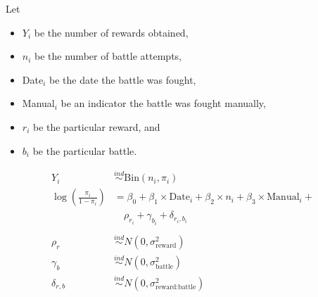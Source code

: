 \documentclass[10pt,aspectratio=169]{beamer}
\newcommand{\ind}{\stackrel{ind}{\sim}}
\begin{document}
\begin{frame}
Let 
\begin{itemize}
\item $Y_i$ be the number of rewards obtained,
\item $n_i$ be the number of battle attempts,
\item Date$_i$ be the date the battle was fought,
\item Manual$_i$ be an indicator the battle was fought manually, 
\item $r_i$ be the particular reward, and
\item $b_i$ be the particular battle. 
\end{itemize}

\vspace{0.1in}

\[ \begin{array}{rl}
Y_i & \ind \mbox{Bin}(n_i,\pi_i) \\
\log\left(\frac{\pi_i}{1-\pi_i}\right) &= \beta_0 + \beta_1\times \mbox{Date}_i + \beta_2 \times n_i + \beta_3 \times \mbox{Manual}_i + \\
& \quad \rho_{r_i} + \gamma_{b_i} + \delta_{r_i,b_i} \\
\\
\rho_r &\ind N\left(0,\sigma_{\mbox{reward}}^2\right) \\
\gamma_b &\ind N\left(0,\sigma_{\mbox{battle}}^2\right) \\
\delta_{r,b} &\ind N\left(0,\sigma_{\mbox{reward:battle}}^2\right) \\
\end{array} \]
\end{frame}
\end{document}

